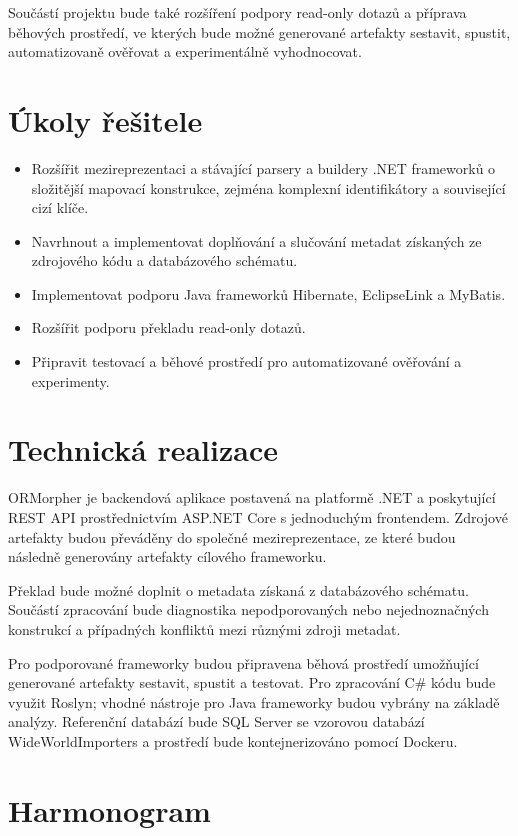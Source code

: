 \documentclass{article}
\begin{document}
Součástí projektu bude také rozšíření podpory read-only dotazů a příprava běhových prostředí, ve kterých bude možné generované artefakty sestavit, spustit, automatizovaně ověřovat a experimentálně vyhodnocovat.

\section{Úkoly řešitele}

\begin{itemize}[leftmargin=*]
\item Rozšířit mezireprezentaci a stávající parsery a buildery .NET frameworků o složitější mapovací konstrukce, zejména komplexní identifikátory a související cizí klíče.
\item Navrhnout a implementovat doplňování a slučování metadat získaných ze zdrojového kódu a databázového schématu.
\item Implementovat podporu Java frameworků Hibernate, EclipseLink a MyBatis.
\item Rozšířit podporu překladu read-only dotazů.
\item Připravit testovací a běhové prostředí pro automatizované ověřování a experimenty.
\end{itemize}

\section{Technická realizace}

ORMorpher je backendová aplikace postavená na platformě .NET a poskytující REST API prostřednictvím ASP.NET Core s jednoduchým frontendem. Zdrojové artefakty budou převáděny do společné mezireprezentace, ze které budou následně generovány artefakty cílového frameworku.

Překlad bude možné doplnit o metadata získaná z databázového schématu. Součástí zpracování bude diagnostika nepodporovaných nebo nejednoznačných konstrukcí a případných konfliktů mezi různými zdroji metadat.

Pro podporované frameworky budou připravena běhová prostředí umožňující generované artefakty sestavit, spustit a testovat. Pro zpracování C\# kódu bude využit Roslyn; vhodné nástroje pro Java frameworky budou vybrány na základě analýzy. Referenční databází bude SQL Server se vzorovou databází WideWorldImporters a prostředí bude kontejnerizováno pomocí Dockeru.

\section{Harmonogram}
\end{document}
